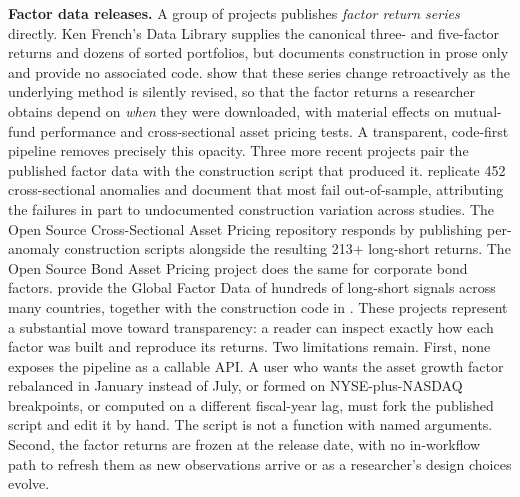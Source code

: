 \documentclass[
  article]{jss}
\newcounter{none} %
\begin{document}
\textbf{Factor data releases.} A group of projects publishes
\emph{factor return series} directly. Ken French's Data Library
\citep{fama.2023} supplies the canonical \citet{fama.1993} three- and
five-factor returns and dozens of sorted portfolios, but documents
construction in prose only and provide no associated code.
\citet{akey.2026} show that these series change retroactively as the
underlying method is silently revised, so that the factor returns a
researcher obtains depend on \emph{when} they were downloaded, with
material effects on mutual-fund performance and cross-sectional asset
pricing tests. A transparent, code-first pipeline removes precisely this
opacity. Three more recent projects pair the published factor data with
the construction script that produced it. \citet{hou.2020} replicate 452
cross-sectional anomalies and document that most fail out-of-sample,
attributing the failures in part to undocumented construction variation
across studies. The Open Source Cross-Sectional Asset Pricing repository
\citep{chen.2022} responds by publishing per-anomaly construction
scripts alongside the resulting 213+ long-short returns. The Open Source
Bond Asset Pricing project \citep{dickerson.2023} does the same for
corporate bond factors. \citet{jensen.2023} provide the Global Factor
Data of hundreds of long-short signals across many countries, together
with the construction code in . These projects
represent a substantial move toward transparency: a reader can inspect
exactly how each factor was built and reproduce its returns. Two
limitations remain. First, none exposes the pipeline as a callable API.
A user who wants the asset growth factor rebalanced in January instead
of July, or formed on NYSE-plus-NASDAQ breakpoints, or computed on a
different fiscal-year lag, must fork the published script and edit it by
hand. The script is not a function with named arguments. Second, the
factor returns are frozen at the release date, with no in-workflow path
to refresh them as new observations arrive or as a researcher's design
choices evolve.
\end{document}

